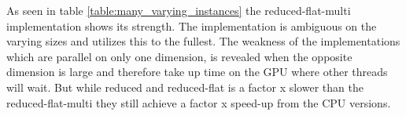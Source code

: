 
As seen in table \ref{table:many_varying_instances} the reduced-flat-multi implementation shows its strength. The implementation is ambiguous on the varying sizes and utilizes this to the fullest. The weakness of the implementations which are parallel on only one dimension, is revealed when the opposite dimension is large and therefore take up time on the GPU where other threads will wait. But while reduced and reduced-flat is a factor x slower than the reduced-flat-multi they still achieve a factor x speed-up from the CPU versions.
